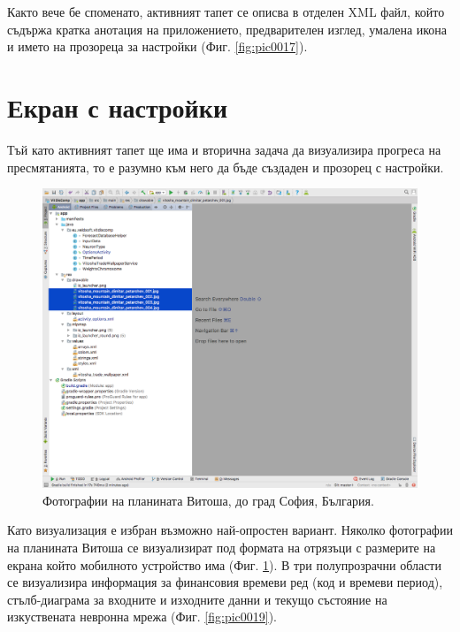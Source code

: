 \documentclass[book,14pt,oneside,openany]{memoir}
\begin{document}
Както вече бе споменато, активният тапет се описва в отделен XML файл, който съдържа кратка анотация на приложението, предварителен изглед, умалена икона и името на прозореца за настройки (Фиг. \ref{fig:pic0017}). 

\section{Екран с настройки}

Тъй като активният тапет ще има и вторична задача да визуализира прогреса на пресмятанията, то е разумно към него да бъде създаден и прозорец с настройки. 

\begin{figure}[h]
  \centering
  \includegraphics[height=0.45\pdfpageheight]{pic0018}
  \caption{Фотографии на планината Витоша, до град София, България.}
\label{fig:pic0018}
\end{figure}
\FloatBarrier

Като визуализация е избран възможно най-опростен вариант. Няколко фотографии на планината Витоша се визуализират под формата на отрязъци с размерите на екрана който мобилното устройство има (Фиг. \ref{fig:pic0018}). В три полупрозрачни области се визуализира информация за финансовия времеви ред (код и времеви период), стълб-диаграма за входните и изходните данни и текущо състояние на изкуствената невронна мрежа (Фиг. \ref{fig:pic0019}). 
\end{document}
